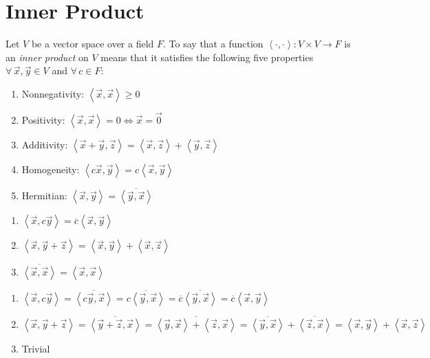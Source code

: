 \documentclass[letterpaper,12pt,fleqn]{article}
\newcommand{\inner}[2]{\left<#1,#2\right>}
\newcommand{\vx}{\vec{x}}
\newcommand{\vy}{\vec{y}}
\newcommand{\vz}{\vec{z}}
\newcommand{\vo}{\vec{0}}
\newcommand{\conj}[1]{\overline{#1}}
\begin{document}
\section*{Inner Product}

\begin{definition}
  Let $V$ be a vector space over a field $F$. To say that a function
  $\inner{\cdot}{\cdot}:V\times V\to F$ is an \emph{inner product} on $V$ means that it
  satisfies the following five properties $\forall\,\vx,\vy\in V$ and $\forall\,c\in F$:
  \begin{enumerate}
  \item Nonnegativity: $\inner{\vx}{\vx}\ge0$
  \item Positivity: $\inner{\vx}{\vx}=0\iff\vx=\vo$
  \item Additivity: $\inner{\vx+\vy}{\vz}=\inner{\vx}{\vz}+\inner{\vy}{\vz}$
  \item Homogeneity: $\inner{c\vx}{\vy}=c\inner{\vx}{\vy}$
  \item Hermitian: $\inner{\vx}{\vy}=\conj{\inner{\vy}{\vx}}$
  \end{enumerate}
\end{definition}

\begin{properties}
  \listbreak
  \begin{enumerate}
  \item $\inner{\vx}{c\vy}=\conj{c}\inner{\vx}{\vy}$
  \item $\inner{\vx}{\vy+\vz}=\inner{\vx}{\vy}+\inner{\vx}{\vz}$
  \item $\conj{\inner{\vx}{\vx}}=\inner{\vx}{\vx}$
  \end{enumerate}
\end{properties}

\begin{theproof}
  \listbreak
  \begin{enumerate}
  \item $\inner{\vx}{c\vy}=\conj{\inner{c\vy}{\vx}}=\conj{c\inner{\vy}{\vx}}=
    \conj{c}\conj{\inner{\vy}{\vx}}=\conj{c}\inner{\vx}{\vy}$

  \item $\inner{\vx}{\vy+\vz}=\conj{\inner{\vy+\vz}{\vx}}=
    \conj{\inner{\vy}{\vx}+\inner{\vz}{\vx}}=
    \conj{\inner{\vy}{\vx}}+\conj{\inner{\vz}{\vx}}=
    \inner{\vx}{\vy}+\inner{\vx}{\vz}$

  \item Trivial
  \end{enumerate}
\end{theproof}
\end{document}
